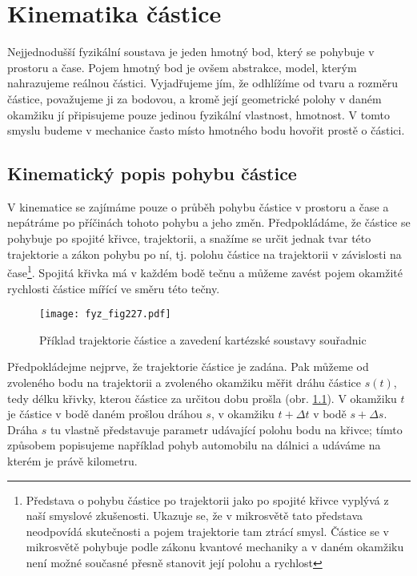 \chapter{Kinematika částice}
\minitoc
  Nejjednodušší fyzikální soustava je jeden hmotný bod, který se pohybuje v prostoru a čase. Pojem
  hmotný bod je ovšem abstrakce, model, kterým nahrazujeme reálnou částici. Vyjadřujeme jím, že
  odhlížíme od tvaru a rozměru částice, považujeme ji za bodovou, a kromě její geometrické polohy v
  daném okamžiku jí připisujeme pouze jedinou fyzikální vlastnost, hmotnost. V tomto smyslu budeme
  v mechanice často místo hmotného bodu hovořit prostě o částici.
  \section{Kinematický popis pohybu částice}
    V kinematice se zajímáme pouze o průběh pohybu částice v prostoru a čase a nepátráme po
    příčinách tohoto pohybu a jeho změn. Předpokládáme, že částice se pohybuje po spojité křivce,
    trajektorii, a snažíme se určit jednak tvar této trajektorie a zákon pohybu po ní, tj. polohu
    částice na trajektorii v závislosti na čase\footnote{Představa o pohybu částice po trajektorii
    jako po spojité křivce vyplývá z naší smyslové zkušenosti. Ukazuje se, že v mikrosvětě tato
    představa neodpovídá skutečnosti a pojem trajektorie tam ztrácí smysl. Částice se v mikrosvětě
    pohybuje podle zákonu kvantové mechaniky a v daném okamžiku není možné současné přesně stanovit
    její polohu a rychlost}. Spojitá křivka má v každém bodě tečnu a můžeme zavést pojem okamžité
    rychlosti částice mířící ve směru této tečny.
  
    \begin{figure}[ht!]
      \centering
      \texttt{[image: fyz\_fig227.pdf]}
      \caption{Příklad trajektorie částice a zavedení kartézské soustavy souřadnic}
      \label{fyz:fig227}
    \end{figure}
  
    Předpokládejme nejprve, že trajektorie částice je zadána. Pak můžeme od zvoleného bodu na
    trajektorii a zvoleného okamžiku měřit dráhu částice $s(t)$, tedy délku křivky, kterou částice
    za určitou dobu prošla (obr. \ref{fyz:fig227}). V okamžiku $t$ je částice v bodě daném
    prošlou dráhou $s$, v okamžiku $t + \Delta t$ v bodě $s + \Delta s$. Dráha $s$ tu vlastně
    představuje parametr udávající polohu bodu na křivce; tímto způsobem popisujeme například pohyb
    automobilu na dálnici a udáváme na kterém je právě kilometru.
  
